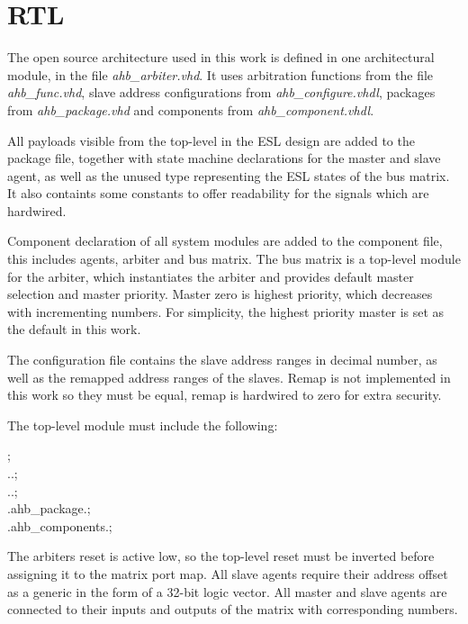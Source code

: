 \section{RTL}
The open source architecture used in this work is defined in one architectural module, in the file \textit{ahb\_arbiter.vhd}. It uses arbitration functions from the file \textit{ahb\_func.vhd}, slave address configurations from \textit{ahb\_configure.vhdl}, packages from \textit{ahb\_package.vhd} and components from \textit{ahb\_component.vhdl}. \par
All payloads visible from the top-level in the ESL design are added to the package file, together with state machine declarations for the master and slave agent, as well as the unused type representing the ESL states of the bus matrix. It also containts some constants to offer readability for the signals which are hardwired. \par
Component declaration of all system modules are added to the component file, this includes agents, arbiter and bus matrix. The bus matrix is a top-level module for the arbiter, which instantiates the arbiter and provides default master selection and master priority. Master zero is highest priority, which decreases with incrementing numbers. For simplicity, the highest priority master is set as the default in this work. \par
The configuration file contains the slave address ranges in decimal number, as well as the remapped address ranges of the slaves. Remap is not implemented in this work so they must be equal, remap is hardwired to zero for extra security. \par
The top-level module must include the following: \par
{} ; \\
 ..; \\ 
 ..; \\
 .ahb\_package.; \\
 .ahb\_components.; \par
The arbiters reset is active low, so the top-level reset must be inverted before assigning it to the matrix port map. All slave agents require their address offset as a generic in the form of a 32-bit logic vector. All master and slave agents are connected to their inputs and outputs of the matrix with corresponding numbers. 

